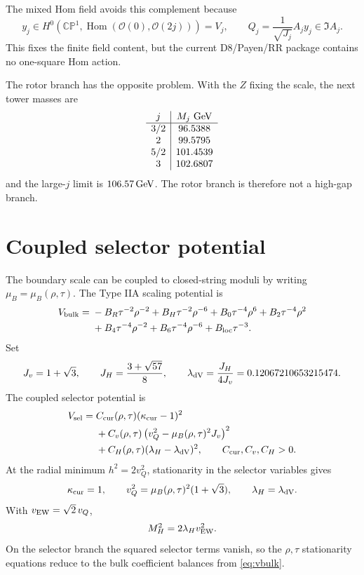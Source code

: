\documentclass[11pt]{article}
\newcommand{\CP}{\mathbb{CP}}
\newcommand{\OO}{\mathcal{O}}
\theoremstyle{plain}
\theoremstyle{definition}
\begin{document}
The mixed Hom field avoids this complement because
\[
  y_j\in H^0(\CP^1,\operatorname{Hom}(\OO(0),\OO(2j)))=V_j,
  \qquad
  Q_j=\frac{1}{\sqrt{J_j}}A_jy_j\in\Im A_j.
\]
This fixes the finite field content, but the current D8/Payen/RR package
contains no one-square Hom action.

The rotor branch has the opposite problem.  With the \(Z\) fixing the scale,
the next tower masses are
\[
\begin{array}{c|c}
j & M_j\ {\rm GeV}\\
\hline
3/2 & 96.5388\\
2 & 99.5795\\
5/2 & 101.4539\\
3 & 102.6807
\end{array}
\]
and the large-\(j\) limit is \(106.57\,{\rm GeV}\).  The rotor branch is
therefore not a high-gap branch.

\section{Coupled selector potential}

The boundary scale can be coupled to closed-string moduli by writing
\(\mu_B=\mu_B(\rho,\tau)\).  The Type IIA scaling potential is
\begin{equation}
\begin{split}
  V_{\rm bulk}
  ={}&-B_R\tau^{-2}\rho^{-2}
  +B_H\tau^{-2}\rho^{-6}
  +B_0\tau^{-4}\rho^6
  +B_2\tau^{-4}\rho^2\\
  &+B_4\tau^{-4}\rho^{-2}
  +B_6\tau^{-4}\rho^{-6}
  +B_{\rm loc}\tau^{-3}.
  \label{eq:vbulk}
\end{split}
\end{equation}
Set
\begin{equation}
  J_v=1+\sqrt3,
  \qquad
  J_H=\frac{3+\sqrt{57}}{8},
  \qquad
  \lambda_{\rm dV}
  =
  \frac{J_H}{4J_v}
  =
  0.12067210653215474.
  \label{eq:scalar-targets}
\end{equation}
The coupled selector potential is
\begin{equation}
\begin{split}
  V_{\rm sel}
  ={}&C_{\rm cur}(\rho,\tau)(\kappa_{\rm cur}-1)^2\\
  &+C_v(\rho,\tau)
  \left(v_Q^2-\mu_B(\rho,\tau)^2J_v\right)^2\\
  &+C_H(\rho,\tau)(\lambda_H-\lambda_{\rm dV})^2,
  \qquad C_{\rm cur},C_v,C_H>0.
  \label{eq:vsel}
\end{split}
\end{equation}
At the radial minimum \(h^2=2v_Q^2\), stationarity in the selector variables
gives
\begin{equation}
  \kappa_{\rm cur}=1,
  \qquad
  v_Q^2=\mu_B(\rho,\tau)^2(1+\sqrt3),
  \qquad
  \lambda_H=\lambda_{\rm dV}.
  \label{eq:selector}
\end{equation}
With \(v_{\rm EW}=\sqrt2\,v_Q\),
\begin{equation}
  M_H^2=2\lambda_Hv_{\rm EW}^2.
  \label{eq:higgs}
\end{equation}
On the selector branch the squared selector terms vanish, so the \(\rho,\tau\)
stationarity equations reduce to the bulk coefficient balances from
\eqref{eq:vbulk}.
\end{document}
